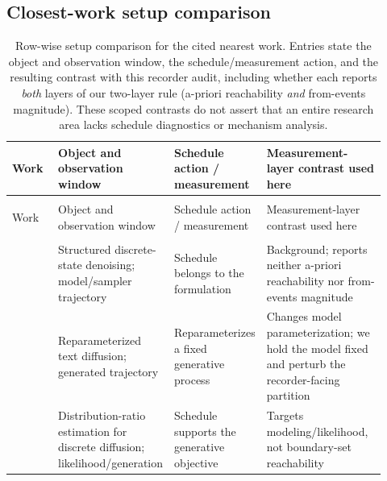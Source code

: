 \documentclass{article}
\begin{document}
\subsection{Closest-work setup comparison}

\begingroup
\small
\setlength{\tabcolsep}{2.2pt}
\setlength{\LTpre}{3pt}
\setlength{\LTpost}{6pt}
\setlength{\LTcapwidth}{\linewidth}
\FloatBarrier
\begin{longtable}{@{}>{\raggedright\arraybackslash}p{0.14\linewidth}
                    >{\raggedright\arraybackslash}p{0.26\linewidth}
                    >{\raggedright\arraybackslash}p{0.17\linewidth}
                    >{\raggedright\arraybackslash}p{0.35\linewidth}@{}}
\caption{Row-wise setup comparison for the cited nearest work. Entries state the
object and observation window, the schedule/measurement action, and the resulting
contrast with this recorder audit, including whether each reports \emph{both} layers
of our two-layer rule (a-priori reachability \emph{and} from-events magnitude).
These scoped contrasts do not assert that an entire research area lacks schedule
diagnostics or mechanism analysis.}\label{tab:closest}\\
\toprule
Work & Object and observation window & Schedule action / measurement & Measurement-layer contrast used here \\
\midrule
\endfirsthead
\multicolumn{4}{@{}l}{\footnotesize\itshape Table~\thetable{} continued}\\
\toprule
Work & Object and observation window & Schedule action / measurement & Measurement-layer contrast used here \\
\midrule
\endhead
\midrule
\multicolumn{4}{r@{}}{\footnotesize\itshape Continued on next page}\\
\endfoot
\bottomrule
\endlastfoot
\citet{austin2021structured} & Structured discrete-state denoising; model/sampler trajectory & Schedule belongs to the formulation & Background; reports neither a-priori reachability nor from-events magnitude \\
\citet{zheng2023reparameterized} & Reparameterized text diffusion; generated trajectory & Reparameterizes a fixed generative process & Changes model parameterization; we hold the model fixed and perturb the recorder-facing partition \\
\citet{lou2024discrete} & Distribution-ratio estimation for discrete diffusion; likelihood/generation & Schedule supports the generative objective & Targets modeling/likelihood, not boundary-set reachability \\

\end{longtable}
\end{document}
